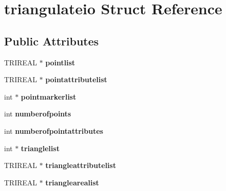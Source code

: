 \hypertarget{structtriangulateio}{
\section{triangulateio Struct Reference}
\label{structtriangulateio}
}
\subsection*{Public Attributes}
\begin{DoxyCompactItemize}
\item 
\hypertarget{structtriangulateio_a601d8261e3e18cd0d4771730ab2172b2}{
TRIREAL $\ast$ {\bfseries pointlist}}
\label{structtriangulateio_a601d8261e3e18cd0d4771730ab2172b2}

\item 
\hypertarget{structtriangulateio_a83e7fd743b37606594ff63caddf920d0}{
TRIREAL $\ast$ {\bfseries pointattributelist}}
\label{structtriangulateio_a83e7fd743b37606594ff63caddf920d0}

\item 
\hypertarget{structtriangulateio_acb2a9792412a2c3051fb869e88cfa602}{
int $\ast$ {\bfseries pointmarkerlist}}
\label{structtriangulateio_acb2a9792412a2c3051fb869e88cfa602}

\item 
\hypertarget{structtriangulateio_a29be46ad3fc4f8c84235e420f7e606ec}{
int {\bfseries numberofpoints}}
\label{structtriangulateio_a29be46ad3fc4f8c84235e420f7e606ec}

\item 
\hypertarget{structtriangulateio_aaac6a34f7d7bf1d1476ce7672f15d976}{
int {\bfseries numberofpointattributes}}
\label{structtriangulateio_aaac6a34f7d7bf1d1476ce7672f15d976}

\item 
\hypertarget{structtriangulateio_a7d0f1c11cd6dc624ae61dbbbcc68b8cb}{
int $\ast$ {\bfseries trianglelist}}
\label{structtriangulateio_a7d0f1c11cd6dc624ae61dbbbcc68b8cb}

\item 
\hypertarget{structtriangulateio_ae73c28f6832b85cf62a97ed68ea73e7c}{
TRIREAL $\ast$ {\bfseries triangleattributelist}}
\label{structtriangulateio_ae73c28f6832b85cf62a97ed68ea73e7c}

\item 
\hypertarget{structtriangulateio_aaec63d04839bd64dc779245e2b011fa4}{
TRIREAL $\ast$ {\bfseries trianglearealist}}
\label{structtriangulateio_aaec63d04839bd64dc779245e2b011fa4}


\end{DoxyCompactItemize}
